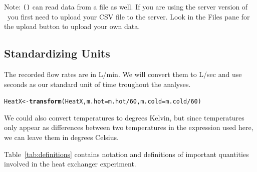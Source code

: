 \documentclass[twoside]{book}\usepackage[]{graphicx}\usepackage[]{xcolor}
\makeatletter
\newcommand{\hlnum}[1]{\textcolor[rgb]{0.686,0.059,0.569}{#1}}%
\newcommand{\hlopt}[1]{\textcolor[rgb]{0,0,0}{#1}}%
\newcommand{\hlstd}[1]{\textcolor[rgb]{0.345,0.345,0.345}{#1}}%
\newcommand{\hlkwb}[1]{\textcolor[rgb]{0.69,0.353,0.396}{#1}}%
\newcommand{\hlkwc}[1]{\textcolor[rgb]{0.333,0.667,0.333}{#1}}%
\newcommand{\hlkwd}[1]{\textcolor[rgb]{0.737,0.353,0.396}{\textbf{#1}}}%
\newenvironment{kframe}{%
 \def\at@end@of@kframe{}%
 \ifinner\ifhmode%
  \def\at@end@of@kframe{\end{minipage}}%
  \begin{minipage}{\columnwidth}%
 \fi\fi%
 \def\FrameCommand##1{\hskip\@totalleftmargin \hskip-\fboxsep
 \colorbox{shadecolor}{##1}\hskip-\fboxsep
     \hskip-\linewidth \hskip-\@totalleftmargin \hskip\columnwidth}%
 \MakeFramed {\advance\hsize-\width
   \@totalleftmargin\z@ \linewidth\hsize
   \@setminipage}}%
 {\par\unskip\endMakeFramed%
 \at@end@of@kframe}
\newenvironment{knitrout}{}{} %
\newcommand{\Rindex}[1]{\index{\texttt{#1}}}
\newcommand{\function}[1]{{\color{purple!75!blue}\texttt{\StrSubstitute{#1}{()}{}()}}\Rindex{#1}}
\def\tab#1{{\sf #1}}
\makeatother
\begin{document}
Note: \function{read.csv()} can read data from a file as well.  If you are using the server
version of \RStudio\ you first need to upload your CSV file to the server.  Look in the \tab{Files} 
pane for the upload button to upload your own data.

\subsection{Standardizing Units}

The recorded flow rates are in L/min.  We will convert them to L/sec and use seconds as
our standard unit of time troughout the analyses.
\begin{knitrout}
\color{fgcolor}\begin{kframe}
\begin{alltt}
\hlstd{HeatX} \hlkwb{<-} \hlkwd{transform}\hlstd{(HeatX,} \hlkwc{m.hot} \hlstd{= m.hot}\hlopt{/}\hlnum{60}\hlstd{,} \hlkwc{m.cold} \hlstd{= m.cold}\hlopt{/}\hlnum{60}\hlstd{)}
\end{alltt}
\end{kframe}
\end{knitrout}

We could also convert temperatures to degrees Kelvin, but since temperatures only appear 
as differences between two temperatures in the expression used here, we can leave them
in degrees Celsius.



Table~\ref{tab:definitions} contains notation and definitions of important quantities
involved in the heat exchanger experiment.
\end{document}
